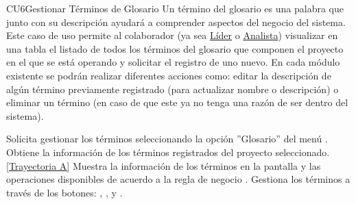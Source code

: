 	\begin{UseCase}{CU6}{Gestionar Términos de Glosario}{
	Un término del glosario es una palabra que junto con su descripción ayudará a comprender  aspectos del negocio del sistema.\\
	
	Este caso de uso permite al colaborador (ya sea \hyperlink{jefe}{Líder} o \hyperlink{analista}{Analista}) visualizar en una tabla el listado de  todos los términos del glosario que componen el proyecto en el que se está operando y solicitar el registro de uno nuevo. En cada módulo existente se podrán realizar diferentes acciones como: editar la descripción de algún término previamente registrado (para actualizar nombre o descripción) o eliminar un término (en caso de que este ya no tenga una razón de ser dentro del sistema).\\
	}
	
\end{UseCase}
\begin{UCtrayectoria}
	\UCpaso[\UCactor] Solicita gestionar los términos seleccionando la opción ''Glosario'' del menú .
	\UCpaso[\UCsist] Obtiene la información de los términos registrados del proyecto seleccionado. \hyperlink{CU6:TAA}{[Trayectoria A]}
	\UCpaso[\UCsist] Muestra la información de los términos en la pantalla  y las operaciones disponibles de acuerdo a la regla de negocio .\label{CU6-P4}
	\UCpaso[\UCactor] Gestiona los términos a través de los botones: , \editar, \eliminar y . 
\end{UCtrayectoria}		
